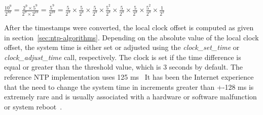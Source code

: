 $\frac{10^9}{2^{32}} = \frac{2^9 \times 5^9}{2^9 \times 2^{23}} =
\frac{5^9}{2^{23}} = \frac{5}{2^3} \times \frac{5}{2^3} \times \frac{5}{2^3} \times \frac{5^2}{2^3}
\times \frac{5}{2^3}  \times \frac{5}{2^3} \times \frac{5^2}{2^3} \times \frac{1}{2^2}$


After the timestamps were converted, the local clock offset is computed
as given in section~\ref{sec:ntp-algorithms}.
Depending on the absolute value of the local clock offset,
the system time is either set or adjusted using the {\it{clock\_set\_time}}
or {\it{clock\_adjust\_time}} call, respectively.
The clock is set if the time difference is equal or greater than
the threshold value, which is 3 seconds by default. %
The reference NTP implementation uses 125 ms~\cite{rfc5905}
It has been the Internet
experience that the need to change the system time in increments
greater than +-128 ms is extremely rare and is usually associated
with a hardware or software malfunction or system reboot~\cite{rfc1589}.

